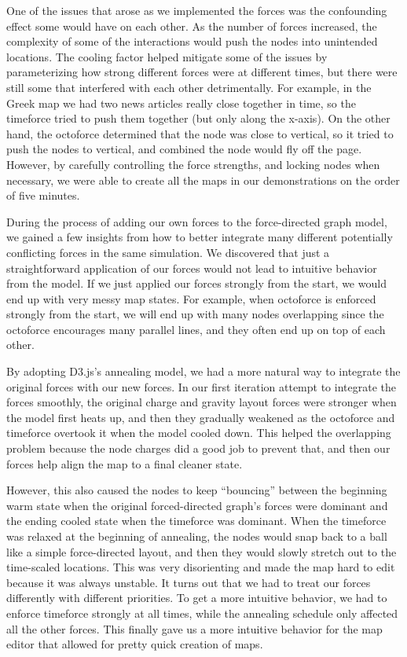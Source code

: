 \documentclass{chi2009}
\begin{document}
One of the issues that arose as we implemented the forces was the confounding effect some would have on each other.  As the number of forces increased, the complexity of some of the interactions would push the nodes into unintended locations.  The cooling factor helped mitigate some of the issues by parameterizing how strong different forces were at different times, but there were still some that interfered with each other detrimentally.  For example, in the Greek map we had two news articles really close together in time, so the timeforce tried to push them together (but only along the x-axis).  On the other hand, the octoforce determined that the node was close to vertical, so it tried to push the nodes to vertical, and combined the node would fly off the page.  However, by carefully controlling the force strengths, and locking nodes when necessary, we were able to create all the maps in our demonstrations on the order of five minutes. 

During the process of adding our own forces to the force-directed graph model, we gained a few insights from how to better integrate many different potentially conflicting forces in the same simulation.  We discovered that just a straightforward application of our forces would not lead to intuitive behavior from the model.  If we just applied our forces strongly from the start, we would end up with very messy map states.  For example, when octoforce is enforced strongly from the start, we will end up with many nodes overlapping since the octoforce encourages many parallel lines, and they often end up on top of each other.  

By adopting D3.js’s annealing model, we had a more natural way to integrate the original forces with our new forces.  In our first iteration attempt to integrate the forces smoothly, the original charge and gravity layout forces were stronger when the model first heats up, and then they gradually weakened as the octoforce and timeforce overtook it when the model cooled down.  This helped the overlapping problem because the node charges did a good job to prevent that, and then our forces help align the map to a final cleaner state.  

However, this also caused the nodes to keep “bouncing” between the beginning warm state when the original forced-directed graph’s forces were dominant and the ending cooled state when the timeforce was dominant.  When the timeforce was relaxed at the beginning of annealing, the nodes would snap back to a ball like a simple force-directed layout, and then they would slowly stretch out to the time-scaled locations.  This was very disorienting and made the map hard to edit because it was always unstable.  
    It turns out that we had to treat our forces differently with different priorities.  To get a more intuitive behavior, we had to enforce timeforce strongly at all times, while the annealing schedule only affected all the other forces.  This finally gave us a more intuitive behavior for the map editor that allowed for pretty quick creation of maps.  
\end{document}
